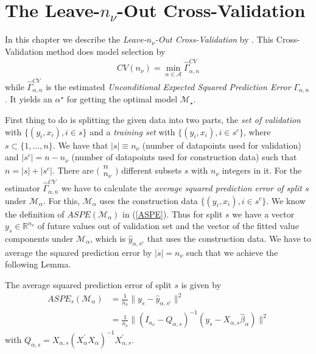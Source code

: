 \documentclass[Research_Module_ES.tex]{subfiles}
\begin{document}
\section{The Leave-$n_\nu$-Out Cross-Validation}
In this chapter we describe the \textit{Leave-$n_\nu$-Out Cross-Validation} by \cite{shao}. This Cross-Validation method does model selection by
\begin{align*}
CV(n_\nu)=\min_{\alpha\in\mathcal{A}}\hat{\Gamma}_{\alpha,n}^{CV}
\end{align*}
while $\hat{\Gamma}_{\alpha,n}^{CV}$ is the estimated \textit{Unconditional Expected Squared Prediction Error} $\Gamma_{\alpha,n}$. It yields an $\alpha^\star$ for getting the optimal model $\mathcal{M}_\star$.


First thing to do is splitting the given data into two parts, the \textit{set of validation} with $\{(y_i,x_i), i\in s\}$ and a \textit{training set} with $\{(y_i,x_i), i\in s^c\}$, where $s\subset\{1,...,n\}$. We have that $|s|\equiv n_\nu$ (number of datapoints used for validation) and $|s^c|=n-n_\nu$ (number of datapoints used for
construction data) such that $n=|s|+|s^c|$. There are 
$\Big(\begin{matrix}
	n\\n_\nu
\end{matrix}\Big)$ different subsets $s$ with $n_\nu$ integers in it. For the estimator $\hat{\Gamma}_{\alpha,n}^{CV}$ we have to calculate the \textit{average squared prediction error of split $s$} under $\mathcal{M}_\alpha$. For this,   $\mathcal{M}_\alpha$ uses the construction data $\{(y_i,x_i), i\in s^c\}$. We know the definition of $ASPE(\mathcal{M}_\alpha)$ in (\ref{ASPE}). Thus for split $s$ we have a vector $y_s\in\mathbb{R}^{n_\nu}$ of future values out of validation set and the vector of the fitted value components under $\mathcal{M}_\alpha$, which is $\hat{y}_{\alpha,s^c}$ that uses the construction data. We have to average the squared prediction error by $|s|=n_\nu$ such that we achieve the following Lemma.
\begin{lemma}
	\label{Equation3.1}
	The average squared prediction error of split $s$ is given by
	\begin{align*}
		ASPE_{s}(\mathcal{M}_\alpha)&=\frac{1}{n_\nu}\parallel y_s-\hat{y}_{\alpha,s^c}\parallel^2\\
		&=\frac{1}{n_\nu}\parallel (I_{n_\nu}-Q_{\alpha,s})^{-1}(y_s-X_{\alpha,s}\hat{\beta}_\alpha)\parallel^2
	\end{align*}
	with $Q_{\alpha,s}=X_{\alpha,s}(X_\alpha^\prime X_\alpha)^{-1}X_{\alpha,s}^\prime$.
\end{lemma}
\end{document}
